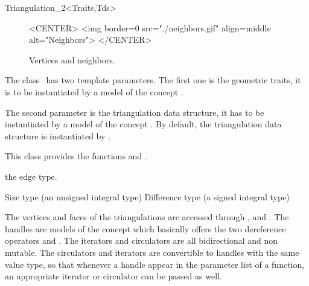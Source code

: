 \begin{ccRefClass}{Triangulation_2<Traits,Tds>}
\begin{figure}
  \begin{ccHtmlOnly}
<CENTER>
<img border=0 src="./neighbors.gif" align=middle alt="Neighbors">
</CENTER>
\end{ccHtmlOnly}     

\caption{Vertices and neighbors.
    \label{Triangulation_ref_Fig_neighbors}}
\end{figure}




\ccParameters
The class \ccRefName\ has  two template parameters. The first one
 is the geometric traits, it is to be instantiated by
 a model of the concept .

The second parameter is the triangulation data structure,
it has to be instantiated by a model of the concept
.
By default, the triangulation data structure  is instantiated by
.


This class provides the functions  and .

\ccTypes
{}
\ccGlue
{}

\ccGlue
{}
\ccGlue
{}

\ccGlue
{}
\ccGlue
{} {the edge type.}

{Size type (an unsigned integral type)}
\ccGlue
{}
{Difference type (a signed integral type)}

\ccThreeToTwo
The vertices and faces of the triangulations are accessed through 
, 
 and . 
The  handles are models of the concept  which basically
offers the two dereference operators \ccc{*} and \ccc{->}.
The iterators and circulators
are all bidirectional and non mutable.
The circulators and iterators are convertible  to handles with the
same value type, so that whenever a handle appear in the parameter 
list of a function, an appropriate iterator or circulator can be passed
as well.


\end{ccRefClass}
